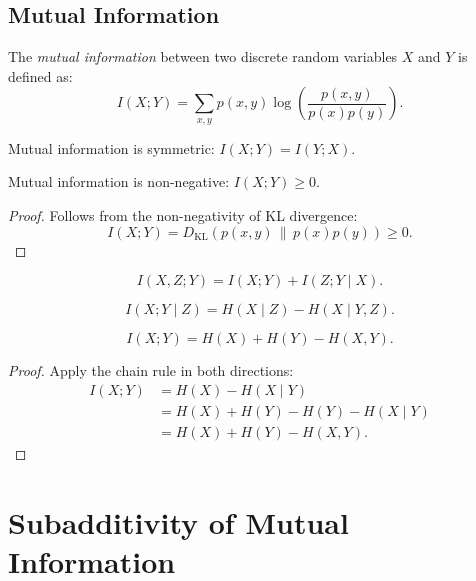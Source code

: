 \documentclass[../../main.tex]{subfiles}
\begin{document}
\subsection{Mutual Information}
\label{sec:mutual_information}

\begin{definition}
The \emph{mutual information} between two discrete random variables \( X \) and \( Y \) is defined as:
\[
I(X; Y) = \sum_{x,y} p(x, y) \log \left( \frac{p(x, y)}{p(x)p(y)} \right).
\]
\end{definition}

\begin{lemma}
Mutual information is symmetric: \( I(X; Y) = I(Y; X) \).
\end{lemma}

\begin{lemma}
Mutual information is non-negative: \( I(X; Y) \geq 0 \).
\end{lemma}

\begin{proof}
Follows from the non-negativity of KL divergence:
\[
I(X; Y) = D_{\mathrm{KL}}(p(x, y) \,\|\, p(x)p(y)) \geq 0.
\]
\end{proof}

\begin{theorem}
\[
I(X, Z; Y) = I(X; Y) + I(Z; Y \mid X).
\]
\end{theorem}

\begin{definition}
\[
I(X; Y \mid Z) = H(X \mid Z) - H(X \mid Y, Z).
\]
\end{definition}

\begin{theorem}
\[
I(X; Y) = H(X) + H(Y) - H(X, Y).
\]
\end{theorem}

\begin{proof}
Apply the chain rule in both directions:
\[
\begin{aligned}
I(X; Y) &= H(X) - H(X \mid Y) \\
&= H(X) + H(Y) - H(Y) - H(X \mid Y) \\
&= H(X) + H(Y) - H(X, Y).
\end{aligned}
\]
\end{proof}

\section{Subadditivity of Mutual Information}
\end{document}
